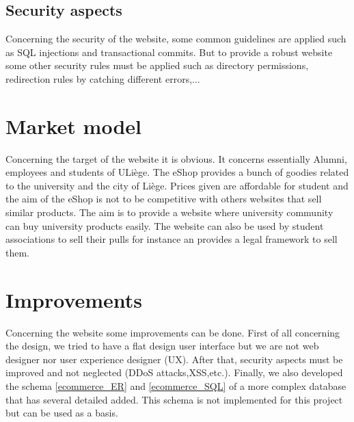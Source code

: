 \documentclass{article}
\begin{document}
\subsection{Security aspects}
Concerning the security of the website, some common guidelines are applied such as SQL injections and transactional commits. But to provide a robust website some other security rules must be applied such as directory permissions, redirection rules by catching different errors,...

\section{Market model}
Concerning the target of the website it is obvious. It concerns essentially Alumni, employees and students of ULiège. The eShop provides a bunch of goodies related to the university and the city of Liège. Prices given are affordable for student and the aim of the eShop is not to be competitive with others websites that sell similar products. The aim is to provide a website where university community can buy university products easily. The website can also be used by student associations to sell their pulls for instance an provides a legal framework to sell them.

\section{Improvements}
Concerning the website some improvements can be done. First of all concerning the design, we tried to have a flat design user interface but we are not web designer nor user experience designer (UX). After that, security aspects must be improved and not neglected (DDoS attacks,XSS,etc.). Finally, we also developed the schema \autoref{ecommerce_ER} and \autoref{ecommerce_SQL} of a more complex database that has several detailed added. This schema is not implemented for this project but can be used as a basis. 
\end{document}
